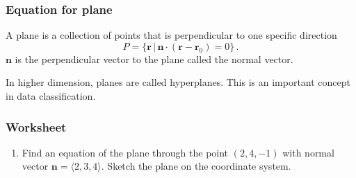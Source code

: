 \documentclass[aspectratio=169]{beamer}
\newcommand{\vect}{\mathbf}
\begin{document}
\begin{frame}
    \frametitle{Equation for plane}
A plane is a collection of points that is perpendicular to one specific direction 
\begin{equation*}
    P = \{ \vect{r} \, | \, \vect{n} \cdot (\vect{r}- \vect{r}_0 ) = 0 \} \,.
\end{equation*}
$\vect{n}$ is the perpendicular vector to the plane called the normal vector.

In higher dimension, planes are called hyperplanes.
This is an important concept in data classification.
\end{frame}

\begin{frame}
    \frametitle{Worksheet}
    \begin{enumerate}
        \item Find an equation of the plane through the point $(2,4,-1)$
            with normal vector $\vect{n} = \langle 2,3,4 \rangle$.
            Sketch the plane on the coordinate system.
    \end{enumerate}
\end{frame}
\end{document}
